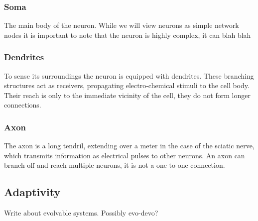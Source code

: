 \subsubsection{Soma}
The main body of the neuron. While we will view neurons as simple network nodes
it is important to note that the neuron is highly complex, it can blah blah
\subsubsection{Dendrites}
To sense its surroundings the neuron is equipped with dendrites. These
branching structures act as receivers, propagating electro-chemical stimuli to
the cell body. Their reach is only to the immediate vicinity of the cell, they
do not form longer connections.
\subsubsection{Axon}
The axon is a long tendril, extending over a meter in the case of the sciatic
nerve, which transmits information as electrical pulses to other neurons. An
axon can branch off and reach multiple neurons, it is not a one to one
connection.
\subsection{Adaptivity}
Write about evolvable systems. Possibly evo-devo?

